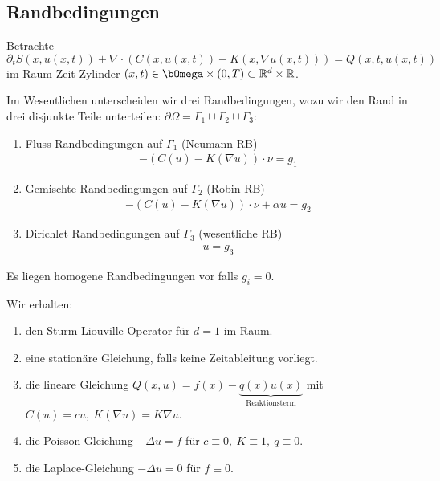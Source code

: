 \subsection{Randbedingungen}


Betrachte $\partial_t S(x,u(x,t)) + \nabla \cdot (C(x,u(x,t)) - K(x,\nabla
u(x,t))) = Q(x,t,u(x,t))$ im Raum-Zeit-Zylinder $(x,t)\in \Omega\times (0,T)
\subset \R^d\times \R$.

Im Wesentlichen unterscheiden wir drei Randbedingungen, wozu wir den Rand in
drei disjunkte Teile unterteilen:
$\partial\Omega = \Gamma_1\cup \Gamma_2\cup \Gamma_3\colon$

\begin{enumerate}[1)]
    \item
	Fluss Randbedingungen auf $\Gamma_1$ (Neumann RB)
	\begin{eqnarray*}
	    -(C(u) - K(\nabla u)) \cdot \nu = g_1
	\end{eqnarray*}
    \item
	Gemischte Randbedingungen auf $\Gamma_2$ (Robin RB)
	\begin{eqnarray*}
	    -(C(u) - K(\nabla u)) \cdot \nu + \alpha u = g_2
	\end{eqnarray*}
     \item
	Dirichlet Randbedingungen auf $\Gamma_3$ (wesentliche RB)
	\begin{eqnarray*}
	    u = g_3
	\end{eqnarray*}
\end{enumerate}


Es liegen homogene Randbedingungen vor falls $g_i = 0$.


\begin{Spezialfälle}
    Wir erhalten:
    \begin{enumerate}[1)]
	\item
	    den Sturm Liouville Operator für $d=1$ im Raum.
	\item
	    eine stationäre Gleichung, falls keine Zeitableitung vorliegt.
	\item
	    die lineare Gleichung $Q(x,u) = f(x) - \underbrace{q(x)u(x)}
	    _{\text{Reaktionsterm}}$
	    mit $C(u) = cu, \ K(\nabla u) = K\nabla u$.
	\item
	    die Poisson-Gleichung $-\Delta u = f$ für $c\equiv 0, \
	    K\equiv 1, \ q\equiv 0$.
	\item
	    die Laplace-Gleichung $-\Delta u = 0$ für $f\equiv 0$.
    \end{enumerate}
\end{Spezialfälle}



